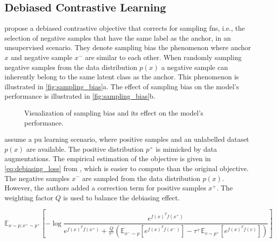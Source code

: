 \subsection{Debiased Contrastive Learning}\label{subsec:debiasing_cl}

\citet{chuang_debiased_2020} propose a debiased contrastive objective that corrects for sampling \acp{fn}, 
i.e., the selection of negative samples that have the same label as the anchor, in an unsupervised scenario.
They denote sampling bias the phenomenon where anchor $x$ and negative sample $x^-$ are similar to each other.
When randomly sampling negative samples from the data distribution $p(x)$ 
a negative sample can inherently belong to the same latent class as the anchor.
This phenomenon is illustrated in \autoref{fig:sampling_bias}a.
The effect of sampling bias on the model's performance is illustrated in \autoref{fig:sampling_bias}b.

\begin{figure}%
    \centering
    \qquad
    \caption{Visualization of sampling bias and its effect on the model's performance.}%
    \label{fig:sampling_bias}%
\end{figure}

\citeauthor{chuang_debiased_2020} assume a \ac{pu} learning scenario, 
where positive samples and an unlabelled dataset $p(x)$ are available.
The positive distribution $p^+$ is mimicked by data augmentations.
The empirical estimation of the objective is given in 
\autoref{eq:debiasing_loss} from \citet{chuang_debiased_2020},
which is easier to compute than the original objective.
The negative samples $x^-$ are sampled from the data distribution $p(x)$.
However, the authors added a correction term for positive samples $x^+$.
The weighting factor $Q$ is used to balance the debiasing effect.

\begin{equation}
    \mathbb{E}_{x \sim p; x^+ \sim p^+}[{-\log{\frac{e^{f(x)^Tf(x^+)}}{e^{f(x)^Tf(x^+)}+ \frac{Q}{\tau^-}(\mathbb{E}_{x^- \sim p}[e^{f(x)^Tf(x^-)}]-\tau^+\mathbb{E}_{v \sim p^+}[e^{f(x)^Tf(v)}])}}}]
    \label{eq:debiasing_loss}
\end{equation}
